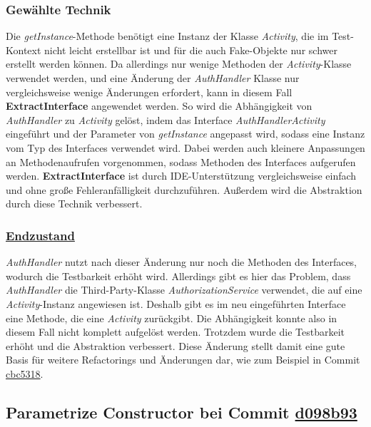 \documentclass[12pt]{article}
\begin{document}
\subsubsection*{Gewählte Technik}

Die \textit{getInstance}-Methode benötigt eine Instanz der Klasse \textit{Activity}, die im Test-Kontext nicht leicht erstellbar ist und für die auch Fake-Objekte nur schwer erstellt werden können. Da allerdings nur wenige Methoden der \textit{Activity}-Klasse verwendet werden, und eine Änderung der \textit{AuthHandler} Klasse nur vergleichsweise wenige Änderungen erfordert, kann in diesem Fall \textbf{ExtractInterface} angewendet werden.
So wird die Abhängigkeit von \textit{AuthHandler} zu \textit{Activity} gelöst, indem das Interface \textit{AuthHandlerActivity} eingeführt und der Parameter von \textit{getInstance} angepasst wird, sodass eine Instanz vom Typ des Interfaces verwendet wird. Dabei werden auch kleinere Anpassungen an Methodenaufrufen vorgenommen, sodass Methoden des Interfaces aufgerufen werden.
\textbf{ExtractInterface} ist durch IDE-Unterstützung vergleichsweise einfach und ohne große Fehleranfälligkeit durchzuführen. Außerdem wird die Abstraktion durch diese Technik verbessert.

\subsubsection*{\href{https://github.com/lukaspanni/OpenSourceStats/tree/1e47e7b2d42c04429a433a6ac3dbea781409d36d/app/src/main/java/de/lukaspanni/opensourcestats/auth/}{Endzustand}}

\textit{AuthHandler} nutzt nach dieser Änderung nur noch die Methoden des Interfaces, wodurch die Testbarkeit erhöht wird.
Allerdings gibt es hier das Problem, dass \textit{AuthHandler} die Third-Party-Klasse \textit{AuthorizationService} verwendet, die auf eine \textit{Activity}-Instanz angewiesen ist.
Deshalb gibt es im neu eingeführten Interface eine Methode, die eine \textit{Activity} zurückgibt. Die Abhängigkeit konnte also in diesem Fall nicht komplett aufgelöst werden.
Trotzdem wurde die Testbarkeit erhöht und die Abstraktion verbessert. Diese Änderung stellt damit eine gute Basis für weitere Refactorings und Änderungen dar, wie zum Beispiel in Commit \href{https://github.com/lukaspanni/OpenSourceStats/commit/cbc53183a878d6507a02daebd55c9c7dfcae9c0f}{cbc5318}.

\newpage

\subsection{Parametrize Constructor bei Commit \href{https://github.com/lukaspanni/OpenSourceStats/commit/d098b93ffd042cb095af679254ed01584417763e} {d098b93}}
\end{document}
